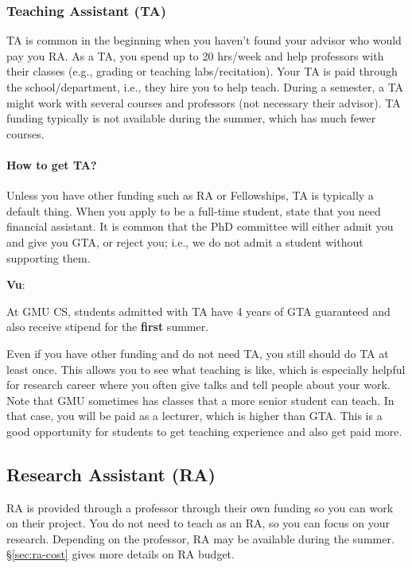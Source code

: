 \documentclass[11pt]{article}
\newenvironment{commentbox}[1][]{
\small
    \begin{cbox}
    \textbf{#1}: 
 }{
   \end{cbox}
}
\begin{document}
\subsubsection{Teaching Assistant (TA)}

TA is common in the beginning when you haven't found your advisor who would pay you RA. As a TA, you spend up to 20 hrs/week and help professors with their classes (e.g., grading or teaching labs/recitation). Your TA is paid through the school/department, i.e., they hire you to help teach.  During a semester, a TA might work with several courses and professors (not necessary their advisor).  TA funding typically is not available during the summer, which has much fewer courses.

\paragraph{How to get TA?}  Unless you have other funding such as RA or Fellowships, TA is typically a default thing. When you apply to be a full-time student,  state that you need financial assistant. It is common that the PhD committee will either admit you and give you GTA, or reject you; i.e., we do not admit a student without supporting them.  

\begin{commentbox}[Vu]
At GMU CS, students admitted with TA have  4 years of GTA guaranteed and also receive  stipend for the \textbf{first} summer.
\end{commentbox}

Even if you have other funding and do not need TA, you still should do TA at least once.  This allows you to see what teaching is like, which is especially helpful for research career where you often give talks and tell people about your work. Note that GMU sometimes has classes that a more senior student can teach.  In that case, you will be paid as a lecturer, which is higher than GTA.  This is a good opportunity for students to get teaching experience and also get paid more.
\subsection{Research Assistant (RA)}
RA is provided through a professor through their own funding so you can work on their project.  
You do not need to teach as an RA, so you can focus on your research. Depending on the professor, RA may be available during the summer. \S\ref{sec:ra-cost} gives more details on RA budget.
\end{document}
